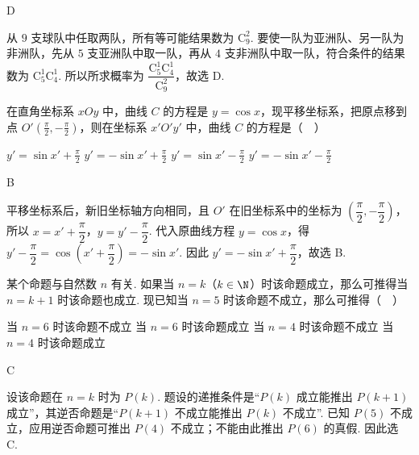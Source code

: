 \documentclass[UTF8,a4paper,oneside,11pt]{ctexbook}
\begin{document}
\begin{answer}
D
\end{answer}

\begin{solution}
从 \(9\) 支球队中任取两队，所有等可能结果数为 \(\mathrm C_9^2\). 要使一队为亚洲队、另一队为非洲队，先从 \(5\) 支亚洲队中取一队，再从 \(4\) 支非洲队中取一队，符合条件的结果数为 \(\mathrm C_5^1\mathrm C_4^1\). 所以所求概率为
\(\dfrac{\mathrm C_5^1\mathrm C_4^1}{\mathrm C_9^2}\)，故选 D.
\end{solution}

\begin{problem}
在直角坐标系 \(xOy\) 中，曲线 \(C\) 的方程是 \(y = \cos x\)，现平移坐标系，把原点移到点 \(O' \left(\frac{\pi}{2}, -\frac{\pi}{2} \right)\)，则在坐标系 \(x'O'y'\) 中，曲线 \(C\) 的方程是（\(\quad\)）

\choices
    {\(y' = \sin x' + \frac{\pi}{2} \)}
    {\(y' = -\sin x' + \frac{\pi}{2} \)}
    {\(y' = \sin x' - \frac{\pi}{2} \)}
    {\(y' = -\sin x' - \frac{\pi}{2} \)}
\end{problem}

\begin{answer}
B
\end{answer}

\begin{solution}
平移坐标系后，新旧坐标轴方向相同，且 \(O'\) 在旧坐标系中的坐标为 \(\left(\dfrac\pi2,-\dfrac\pi2\right)\)，所以
\(x=x'+\dfrac\pi2\)，\(y=y'-\dfrac\pi2\). 代入原曲线方程 \(y=\cos x\)，得
\(y'-\dfrac\pi2=\cos\left(x'+\dfrac\pi2\right)=-\sin x'\). 因此 \(y'=-\sin x'+\dfrac\pi2\)，故选 B.
\end{solution}

\begin{problem}
某个命题与自然数 \(n\) 有关. 如果当 \(n = k\)（\(k \in \N\)）时该命题成立，那么可推得当 \(n = k + 1\) 时该命题也成立. 现已知当 \(n = 5\) 时该命题不成立，那么可推得（\(\quad\)）

\choices
    {当 \(n=6\) 时该命题不成立}
    {当 \(n=6\) 时该命题成立}
    {当 \(n=4\) 时该命题不成立}
    {当 \(n=4\) 时该命题成立}
\end{problem}

\begin{answer}
C
\end{answer}

\begin{solution}
设该命题在 \(n=k\) 时为 \(P(k)\). 题设的递推条件是“\(P(k)\) 成立能推出 \(P(k+1)\) 成立”，其逆否命题是“\(P(k+1)\) 不成立能推出 \(P(k)\) 不成立”. 已知 \(P(5)\) 不成立，应用逆否命题可推出 \(P(4)\) 不成立；不能由此推出 \(P(6)\) 的真假. 因此选 C.
\end{solution}
\end{document}
